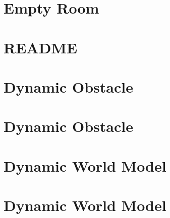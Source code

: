 \documentclass[twoside]{book}
\newcommand{\+}{\discretionary{\mbox{\scriptsize$\hookleftarrow$}}{}{}}
\begin{document}
\chapter{Empty Room}
\label{md_smacc2_sm_reference_library_sm_dance_bot_warehouse_models_empty_room_README}

\chapter{README}
\label{md_smacc2_sm_reference_library_sm_dance_bot_warehouse_README}

\chapter{Dynamic Obstacle}
\label{md_smacc2_sm_reference_library_sm_dance_bot_warehouse_2_models_dynamic_obstacle_copy_README}

\chapter{Dynamic Obstacle}
\label{md_smacc2_sm_reference_library_sm_dance_bot_warehouse_2_models_dynamic_obstacle_README}

\chapter{Dynamic World Model}
\label{md_smacc2_sm_reference_library_sm_dance_bot_warehouse_2_models_dynamic_world_copy_README}

\chapter{Dynamic World Model}
\label{md_smacc2_sm_reference_library_sm_dance_bot_warehouse_2_models_dynamic_world_README}

\end{document}
